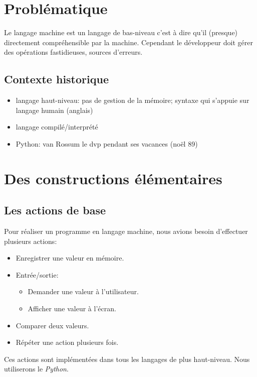 \documentclass[a4paper,11pt]{article}
\begin{document}
\begin{Form}
\section{Problématique}
Le langage machine est un langage de bas-niveau c'est à dire qu'il (presque) directement compréhensible par la machine. Cependant le développeur doit gérer des opérations fastidieuses, sources d'erreurs.
\begin{center}
\end{center}
\begin{commentprof}
\section*{Contexte historique}
\begin{itemize}
\item langage haut-niveau: pas de gestion de la mémoire; syntaxe qui s'appuie sur langage humain (anglais)
\item langage compilé/interprété
\item Python: van Rossum le dvp pendant ses vacances (noël 89)
\end{itemize}
\end{commentprof}
\section{Des constructions élémentaires}
\subsection{Les actions de base}
Pour réaliser un programme en langage machine, nous avions besoin d'effectuer plusieurs actions:
\begin{itemize}
\item Enregistrer une valeur en mémoire.
\item Entrée/sortie:
\begin{itemize}
\item Demander une valeur à l'utilisateur.
\item Afficher une valeur à l'écran.
\end{itemize}
\item Comparer deux valeurs.
\item Répéter une action plusieurs fois.
\end{itemize}
Ces actions sont implémentées dans tous les langages de plus haut-niveau. Nous utiliserons le \emph{Python}.

\end{Form}
\end{document}
